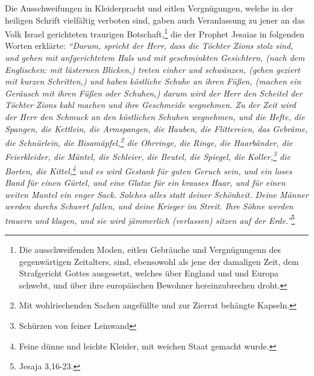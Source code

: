 Die Ausschweifungen in Kleiderpracht und eitlen Vergnügungen, welche in der
heiligen Schrift vielfältig verboten sind, gaben
auch
Veranlassung zu jener an
das Volk Israel gerichteten traurigen
Botschaft,\footnote{
    Die ausschweifenden Moden, eitlen Gebräuche und Vergnügungenn des
gegenwärtigen
    Zeitalters, sind,
    ebensowohl als jene der damaligen Zeit, dem Strafgericht Gottes ausgesetzt,
    welches über England und und Europa schwebt, und über ihre europäischen
    Bewohner hereinzubrechen droht.}
die der Prophet Jesaias in folgenden Worten erklärte:
\textit{
    "`Darum, spricht der Herr, dass die Töchter Zions stolz sind, und gehen mit anfgerichtetem Hals und mit geschminkten
    Gesichtern, (nach dem Englischen: mit lüsternen Blicken,) treten einher und
    schwänzen, (gehen geziert mit kurzen Schritten,) und haben köstliche Schuhe
an
    ihren Füßen, (machen ein Geräusch mit ihren Füßen oder Schuhen,) darum wird
der
    Herr den Scheitel der Töchter Zions kahl machen und ihre Geschmeide
    wegnehmen. Zu der Zeit wird der Herr den Schmuck an den köstlichen Schuhen
    wegnehmen, und die Hefte, die Spangen, die Kettlein, die Armspangen, die
    Hauben, die Flittereien, das Gebräme, die Schnürlein, die
Bisamäpfel,\footnote{
        Mit wohlriechenden Sachen angefüllte und zur Zierrat
        behängte Kapseln.}
    die Ohrringe, die Ringe, die Haarbänder, die Feierkleider,
    die Mäntel, die Schleier, die Beutel, die Spiegel, die
Koller,\footnote{Schürzen von feiner Leinwand}
    die Borten, die Kittel,\footnote{Feine dünne und leichte
        Kleider, mit weichen Staat gemacht wurde.} und es wird Gestank für guten
        Geruch sein, und ein loses Band für einen Gürtel, und eine Glatze für
ein
        krauses Haar, und für einen weiten Mantel ein enger Sack. Solches alles
	statt deiner Schönheit. Deine Männer werden durchs Schwert fallen, und
deine
	Krieger im Streit. Ihre Söhne werden trauern und klagen, und sie wird
	jämmerlich (verlassen) sitzen auf der Erde."'}\footnote{Jesaja 3,16-23.}

\medskip

